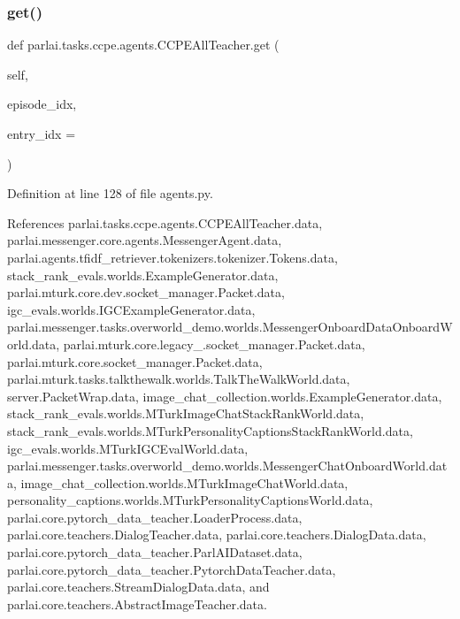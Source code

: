 \subsubsection{\texorpdfstring{get()}{get()}}
{\footnotesize\ttfamily def parlai.\+tasks.\+ccpe.\+agents.\+C\+C\+P\+E\+All\+Teacher.\+get (\begin{DoxyParamCaption}\item[{}]{self,  }\item[{}]{episode\+\_\+idx,  }\item[{}]{entry\+\_\+idx = {} }\end{DoxyParamCaption})}



Definition at line 128 of file agents.\+py.



References parlai.\+tasks.\+ccpe.\+agents.\+C\+C\+P\+E\+All\+Teacher.\+data, parlai.\+messenger.\+core.\+agents.\+Messenger\+Agent.\+data, parlai.\+agents.\+tfidf\+\_\+retriever.\+tokenizers.\+tokenizer.\+Tokens.\+data, stack\+\_\+rank\+\_\+evals.\+worlds.\+Example\+Generator.\+data, parlai.\+mturk.\+core.\+dev.\+socket\+\_\+manager.\+Packet.\+data, igc\+\_\+evals.\+worlds.\+I\+G\+C\+Example\+Generator.\+data, parlai.\+messenger.\+tasks.\+overworld\+\_\+demo.\+worlds.\+Messenger\+Onboard\+Data\+Onboard\+World.\+data, parlai.\+mturk.\+core.\+legacy\+\_.\+socket\+\_\+manager.\+Packet.\+data, parlai.\+mturk.\+core.\+socket\+\_\+manager.\+Packet.\+data, parlai.\+mturk.\+tasks.\+talkthewalk.\+worlds.\+Talk\+The\+Walk\+World.\+data, server.\+Packet\+Wrap.\+data, image\+\_\+chat\+\_\+collection.\+worlds.\+Example\+Generator.\+data, stack\+\_\+rank\+\_\+evals.\+worlds.\+M\+Turk\+Image\+Chat\+Stack\+Rank\+World.\+data, stack\+\_\+rank\+\_\+evals.\+worlds.\+M\+Turk\+Personality\+Captions\+Stack\+Rank\+World.\+data, igc\+\_\+evals.\+worlds.\+M\+Turk\+I\+G\+C\+Eval\+World.\+data, parlai.\+messenger.\+tasks.\+overworld\+\_\+demo.\+worlds.\+Messenger\+Chat\+Onboard\+World.\+data, image\+\_\+chat\+\_\+collection.\+worlds.\+M\+Turk\+Image\+Chat\+World.\+data, personality\+\_\+captions.\+worlds.\+M\+Turk\+Personality\+Captions\+World.\+data, parlai.\+core.\+pytorch\+\_\+data\+\_\+teacher.\+Loader\+Process.\+data, parlai.\+core.\+teachers.\+Dialog\+Teacher.\+data, parlai.\+core.\+teachers.\+Dialog\+Data.\+data, parlai.\+core.\+pytorch\+\_\+data\+\_\+teacher.\+Parl\+A\+I\+Dataset.\+data, parlai.\+core.\+pytorch\+\_\+data\+\_\+teacher.\+Pytorch\+Data\+Teacher.\+data, parlai.\+core.\+teachers.\+Stream\+Dialog\+Data.\+data, and parlai.\+core.\+teachers.\+Abstract\+Image\+Teacher.\+data.



